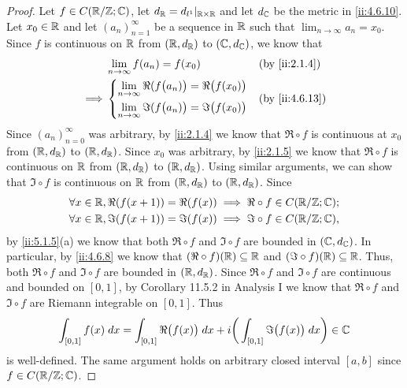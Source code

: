 \begin{proof}
  Let \(f \in C(\mathbb{R} / \mathbb{Z} ; \mathbb{C})\), let \(d_{\mathbb{R}} = d_{l^1}|_{\mathbb{R} \times \mathbb{R}}\) and let \(d_{\mathbb{C}}\) be the metric in \cref{ii:4.6.10}.
  Let \(x_0 \in \mathbb{R}\) and let \((a_n)_{n = 1}^\infty\) be a sequence in \(\mathbb{R}\) such that \(\lim_{n \to \infty} a_n = x_0\).
  Since \(f\) is continuous on \(\mathbb{R}\) from \((\mathbb{R}, d_{\mathbb{R}})\) to \((\mathbb{C}, d_{\mathbb{C}})\), we know that
  \begin{align*}
             & \lim_{n \to \infty} f(a_n) = f(x_0)                                           &  & \by{ii:2.1.4} \\
    \implies & \begin{dcases}
                 \lim_{n \to \infty} \Re(f\big(a_n)\big) = \Re\big(f(x_0)\big) \\
                 \lim_{n \to \infty} \Im(f\big(a_n)\big) = \Im\big(f(x_0)\big)
               \end{dcases} &  & \by{ii:4.6.13}
  \end{align*}
  Since \((a_n)_{n = 0}^\infty\) was arbitrary, by \cref{ii:2.1.4} we know that \(\Re \circ f\) is continuous at \(x_0\) from \((\mathbb{R}, d_{\mathbb{R}})\) to \((\mathbb{R}, d_{\mathbb{R}})\).
  Since \(x_0\) was arbitrary, by \cref{ii:2.1.5} we know that \(\Re \circ f\) is continuous on \(\mathbb{R}\) from \((\mathbb{R}, d_{\mathbb{R}})\) to \((\mathbb{R}, d_{\mathbb{R}})\).
  Using similar arguments, we can show that \(\Im \circ f\) is continuous on \(\mathbb{R}\) from \((\mathbb{R}, d_{\mathbb{R}})\) to \((\mathbb{R}, d_{\mathbb{R}})\).
  Since
  \begin{align*}
     & \forall x \in \mathbb{R}, \Re(f(x + 1)) = \Re(f(x)) \implies \Re \circ f \in C(\mathbb{R} / \mathbb{Z} ; \mathbb{C}); \\
     & \forall x \in \mathbb{R}, \Im(f(x + 1)) = \Im(f(x)) \implies \Im \circ f \in C(\mathbb{R} / \mathbb{Z} ; \mathbb{C}),
  \end{align*}
  by \cref{ii:5.1.5}(a) we know that both \(\Re \circ f\) and \(\Im \circ f\) are bounded in \((\mathbb{C}, d_{\mathbb{C}})\).
  In particular, by \cref{ii:4.6.8} we know that \((\Re \circ f)(\mathbb{R}) \subseteq \mathbb{R}\) and \((\Im \circ f)(\mathbb{R}) \subseteq \mathbb{R}\).
  Thus, both \(\Re \circ f\) and \(\Im \circ f\) are bounded in \((\mathbb{R}, d_{\mathbb{R}})\).
  Since \(\Re \circ f\) and \(\Im \circ f\) are continuous and bounded on \([0, 1]\), by Corollary 11.5.2 in Analysis I we know that \(\Re \circ f\) and \(\Im \circ f\) are Riemann integrable on \([0, 1]\).
  Thus
  \[
    \int_{[0, 1]} f(x) \; dx = \int_{[0, 1]} \Re\big(f(x)\big) \; dx + i \bigg(\int_{[0, 1]} \Im\big(f(x)\big) \; dx\bigg) \in \mathbb{C}
  \]
  is well-defined.
  The same argument holds on arbitrary closed interval \([a, b]\) since \(f \in C(\mathbb{R} / \mathbb{Z} ; \mathbb{C})\).
\end{proof}


